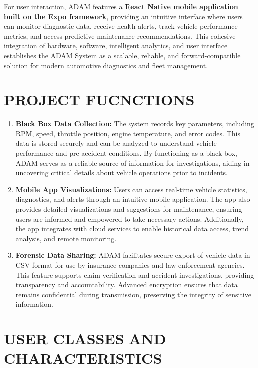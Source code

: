 \vspace{0.3cm}

For user interaction, ADAM features a \textbf{React Native mobile application built on the Expo framework}, providing an intuitive interface where users can monitor diagnostic data, receive health alerts, track vehicle performance metrics, and access predictive maintenance recommendations. This cohesive integration of hardware, software, intelligent analytics, and user interface establishes the ADAM System as a scalable, reliable, and forward-compatible solution for modern automotive diagnostics and fleet management.

\section{PROJECT FUCNCTIONS}

\begin{enumerate}
    \item \textbf{Black Box Data Collection:} The system records key parameters, including RPM, speed, throttle position, engine temperature, and error codes. This data is stored securely and can be analyzed to understand vehicle performance and pre-accident conditions. By functioning as a black box, ADAM serves as a reliable source of information for investigations, aiding in uncovering critical details about vehicle operations prior to incidents.
    \item \textbf{Mobile App Visualizations:} Users can access real-time vehicle statistics, diagnostics, and alerts through an intuitive mobile application. The app also provides detailed visualizations and suggestions for maintenance, ensuring users are informed and empowered to take necessary actions. Additionally, the app integrates with cloud services to enable historical data access, trend analysis, and remote monitoring.
    \item \textbf{Forensic Data Sharing:} ADAM facilitates secure export of vehicle data in CSV format for use by insurance companies and law enforcement agencies. This feature supports claim verification and accident investigations, providing transparency and accountability. Advanced encryption ensures that data remains confidential during transmission, preserving the integrity of sensitive information.
\end{enumerate}

\section{USER CLASSES AND CHARACTERISTICS}

